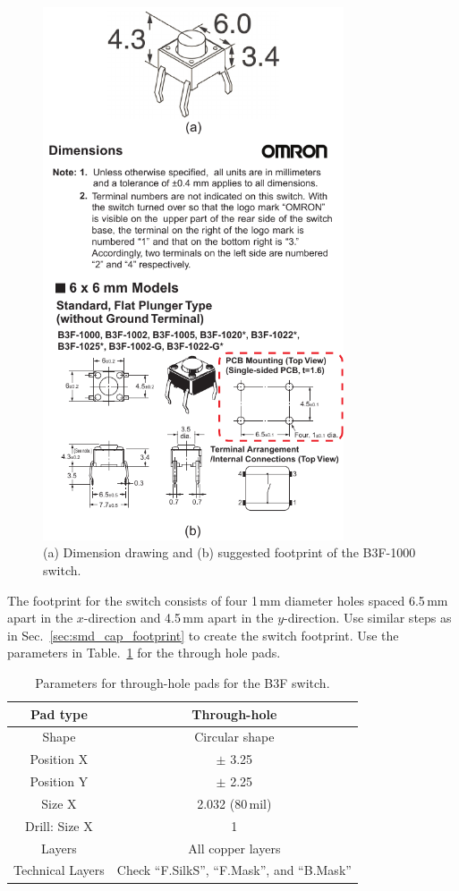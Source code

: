 \documentclass[12pt,letterpaper]{scrartcl}
\begin{document}
	\begin{figure}[hp]
		\centering
		\includegraphics[width=3.5in]{b3f-datasheet}
		\caption{(a) Dimension drawing and (b) suggested footprint of the B3F-1000 switch.}
		\label{b3f-datasheet}
	\end{figure}

The footprint for the switch consists of four 1\,mm diameter holes spaced 6.5\,mm apart in the $x$-direction and 4.5\,mm apart in the $y$-direction. Use similar steps as in Sec.~\ref{sec:smd_cap_footprint} to create the switch footprint. Use the parameters in Table.~\ref{tab:pad-parameters} for the through hole pads. 
	\begin{table}[hp]
		\centering
		\caption{Parameters for through-hole pads for the B3F switch.}
		\renewcommand{\arraystretch}{1.2}
		\small
		\begin{tabular}{|c|c|}
			\hline  Pad type & Through-hole \\ 
			\hline  Shape & Circular shape \\ 
			\hline  Position X & $\pm$ 3.25 \\ 
			\hline  Position Y & $\pm$ 2.25  \\ 
			\hline  Size X & 2.032 (80\,mil) \\ 
			\hline Drill: Size X & 1 \\					 
			\hline  Layers & All copper layers \\ 
			\hline  Technical Layers & Check ``F.SilkS'', ``F.Mask'',  and ``B.Mask''  \\ 
			\hline 
		\end{tabular} 
		\label{tab:pad-parameters}
	\end{table}
			
\end{document}
